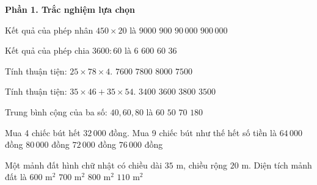 \textbf{Phần 1. Trắc nghiệm lựa chọn}

\begin{ex} %
Kết quả của phép nhân $450 \times 20$ là
\choice
{\True $9000$}
{$900$}
{$90\,000$}
{$900\,000$}
\end{ex}

\begin{ex} %
Kết quả của phép chia $3600 : 60$ là
\choice
{$6$}
{$600$}
{\True $60$}
{$36$}
\end{ex}

\begin{ex} %
Tính thuận tiện: $25 \times 78 \times 4$.
\choice
{$7600$}
{\True $7800$}
{$8000$}
{$7500$}
\end{ex}

\begin{ex} %
Tính thuận tiện: $35 \times 46 + 35 \times 54$.
\choice
{$3400$}
{$3600$}
{$3800$}
{\True $3500$}
\end{ex}

\begin{ex} %
Trung bình cộng của ba số: $40, 60, 80$ là
\choice
{\True $60$}
{$50$}
{$70$}
{$180$}
\end{ex}

\begin{ex} %
Mua 4 chiếc bút hết $32\,000$ đồng. Mua 9 chiếc bút như thế hết số tiền là
\choice
{$64\,000$ đồng}
{$80\,000$ đồng}
{\True $72\,000$ đồng}
{$76\,000$ đồng}
\end{ex}

\begin{ex} %
Một mảnh đất hình chữ nhật có chiều dài $35\text{ m}$, chiều rộng $20\text{ m}$. Diện tích mảnh đất là
\choice
{$600\text{ m}^2$}
{\True $700\text{ m}^2$}
{$800\text{ m}^2$}
{$110\text{ m}^2$}
\end{ex}


